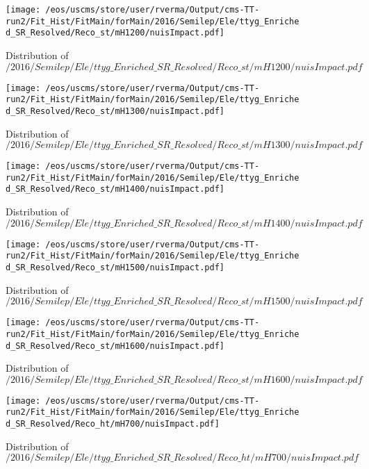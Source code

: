 \begin{figure}
\centering
\texttt{[image: /eos/uscms/store/user/rverma/Output/cms-TT-run2/Fit\_Hist/FitMain/forMain/2016/Semilep/Ele/ttyg\_Enriched\_SR\_Resolved/Reco\_st/mH1200/nuisImpact.pdf]}
\caption{Distribution of $/2016/Semilep/Ele/ttyg\_Enriched\_SR\_Resolved/Reco\_st/mH1200/nuisImpact.pdf$}
\end{figure}

\begin{figure}
\centering
\texttt{[image: /eos/uscms/store/user/rverma/Output/cms-TT-run2/Fit\_Hist/FitMain/forMain/2016/Semilep/Ele/ttyg\_Enriched\_SR\_Resolved/Reco\_st/mH1300/nuisImpact.pdf]}
\caption{Distribution of $/2016/Semilep/Ele/ttyg\_Enriched\_SR\_Resolved/Reco\_st/mH1300/nuisImpact.pdf$}
\end{figure}

\begin{figure}
\centering
\texttt{[image: /eos/uscms/store/user/rverma/Output/cms-TT-run2/Fit\_Hist/FitMain/forMain/2016/Semilep/Ele/ttyg\_Enriched\_SR\_Resolved/Reco\_st/mH1400/nuisImpact.pdf]}
\caption{Distribution of $/2016/Semilep/Ele/ttyg\_Enriched\_SR\_Resolved/Reco\_st/mH1400/nuisImpact.pdf$}
\end{figure}

\begin{figure}
\centering
\texttt{[image: /eos/uscms/store/user/rverma/Output/cms-TT-run2/Fit\_Hist/FitMain/forMain/2016/Semilep/Ele/ttyg\_Enriched\_SR\_Resolved/Reco\_st/mH1500/nuisImpact.pdf]}
\caption{Distribution of $/2016/Semilep/Ele/ttyg\_Enriched\_SR\_Resolved/Reco\_st/mH1500/nuisImpact.pdf$}
\end{figure}

\begin{figure}
\centering
\texttt{[image: /eos/uscms/store/user/rverma/Output/cms-TT-run2/Fit\_Hist/FitMain/forMain/2016/Semilep/Ele/ttyg\_Enriched\_SR\_Resolved/Reco\_st/mH1600/nuisImpact.pdf]}
\caption{Distribution of $/2016/Semilep/Ele/ttyg\_Enriched\_SR\_Resolved/Reco\_st/mH1600/nuisImpact.pdf$}
\end{figure}

\begin{figure}
\centering
\texttt{[image: /eos/uscms/store/user/rverma/Output/cms-TT-run2/Fit\_Hist/FitMain/forMain/2016/Semilep/Ele/ttyg\_Enriched\_SR\_Resolved/Reco\_ht/mH700/nuisImpact.pdf]}
\caption{Distribution of $/2016/Semilep/Ele/ttyg\_Enriched\_SR\_Resolved/Reco\_ht/mH700/nuisImpact.pdf$}
\end{figure}


